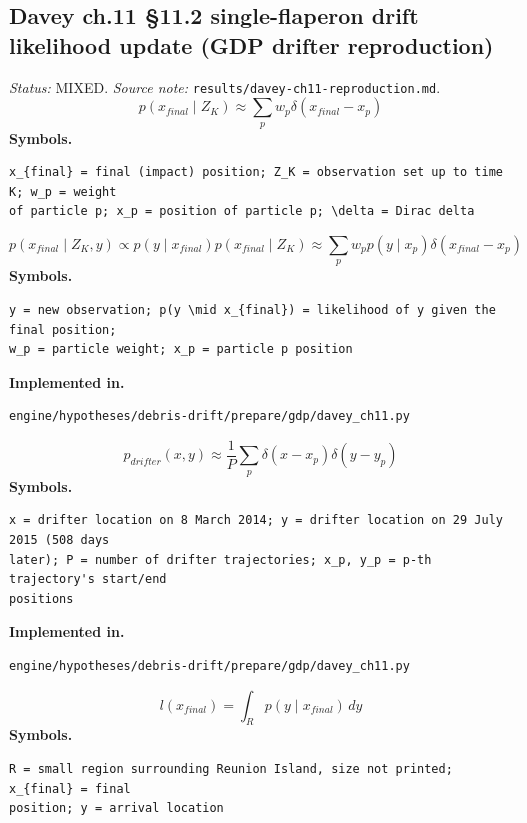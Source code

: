 \documentclass[11pt,a4paper]{article}
\begin{document}
\subsection{Davey ch.11 §11.2 single-flaperon drift likelihood update (GDP drifter reproduction)}
\noindent\textit{Status:} MIXED. \textit{Source note:} \texttt{results/davey-ch11-reproduction.md}.
\medskip
\begin{equation}
p(x_{final} \mid Z_K) \approx \sum_p w_p \delta(x_{final} - x_p)
\end{equation}
\noindent\textbf{Symbols.}
\begin{verbatim}
x_{final} = final (impact) position; Z_K = observation set up to time K; w_p = weight
of particle p; x_p = position of particle p; \delta = Dirac delta
\end{verbatim}
\medskip
\begin{equation}
p(x_{final} \mid Z_K, y) \propto p(y \mid x_{final}) p(x_{final} \mid Z_K) \approx \sum_p w_p p(y \mid x_p) \delta(x_{final} - x_p)
\end{equation}
\noindent\textbf{Symbols.}
\begin{verbatim}
y = new observation; p(y \mid x_{final}) = likelihood of y given the final position;
w_p = particle weight; x_p = particle p position
\end{verbatim}
\noindent\textbf{Implemented in.}
\begin{verbatim}
engine/hypotheses/debris-drift/prepare/gdp/davey_ch11.py
\end{verbatim}
\medskip
\begin{equation}
p_{drifter}(x, y) \approx \frac{1}{P} \sum_p \delta(x - x_p) \delta(y - y_p)
\end{equation}
\noindent\textbf{Symbols.}
\begin{verbatim}
x = drifter location on 8 March 2014; y = drifter location on 29 July 2015 (508 days
later); P = number of drifter trajectories; x_p, y_p = p-th trajectory's start/end
positions
\end{verbatim}
\noindent\textbf{Implemented in.}
\begin{verbatim}
engine/hypotheses/debris-drift/prepare/gdp/davey_ch11.py
\end{verbatim}
\medskip
\begin{equation}
l(x_{final}) = \int_R p(y \mid x_{final})\, dy
\end{equation}
\noindent\textbf{Symbols.}
\begin{verbatim}
R = small region surrounding Reunion Island, size not printed; x_{final} = final
position; y = arrival location
\end{verbatim}
\end{document}

